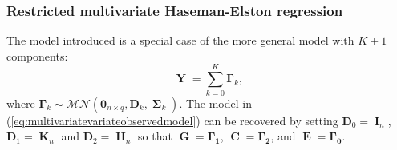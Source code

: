 \documentclass[12pt]{article}
\newcommand{\argmax}{\operatorname*{arg \ max}}
\DeclareMathOperator{\Y}{\mathbf{Y}}
\DeclareMathOperator{\G}{\mathbf{G}}
\DeclareMathOperator{\C}{\mathbf{C}}
\DeclareMathOperator{\E}{\mathbf{E}}
\DeclareMathOperator{\K}{\mathbf{K}}
\DeclareMathOperator{\Hn}{\mathbf{H}}
\DeclareMathOperator{\I}{\mathbf{I}}
\DeclareMathOperator{\bSigma}{\mathbf{\Sigma}}
\DeclareMathOperator{\tr}{tr}
\begin{document}



\vspace{-3.5mm}

\subsubsection{Restricted multivariate Haseman-Elston regression}

The model introduced is a special case of the more general model with $K + 1$ components:
\begin{equation} \label{eq:genmodel}
\Y = \sum_{k = 0}^K \boldsymbol{\Gamma}_k,
\end{equation}
where $\boldsymbol{\Gamma}_k \sim \mathcal{MN}(\mathbf{0}_{n \times q}, \mathbf{D}_k, \bSigma_k)$. The model in (\ref{eq:multivariatevariateobservedmodel}) can be recovered by setting $\mathbf{D}_0 = \I_n$, $\mathbf{D}_1 = \K_n$ and $\mathbf{D}_2 = \Hn_n$ so that $\G = \boldsymbol{\Gamma_1}$, $\C = \boldsymbol{\Gamma_2}$, and $\E = \boldsymbol{\Gamma_0}$.
\end{document}
